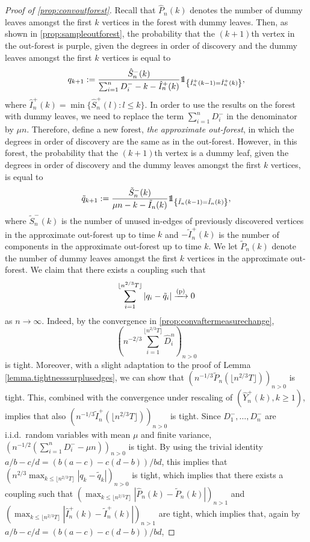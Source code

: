 \begin{proof}[Proof of \cref{prop:convoutforest}]
Recall that $\hat{P}_n(k)$ denotes the number of dummy leaves amongst the first $k$ vertices in the forest with dummy leaves. Then, as shown in \cref{prop:sampleoutforest}, the probability that the $(k+1)$th vertex in the out-forest is purple, given the degrees in order of discovery and the dummy leaves amongst the first $k$ vertices is equal to
$$q_{k+1}:=\frac{\hat{S}^-_n(k)}{\sum_{i=1}^n D^-_i-k-\hat{I}^+_n(k)}\one_{\left\{\hat{I}^+_n(k-1)= \hat{I}^+_n(k)\right\}},$$
where $\hat{I}^+_n(k)=\min\{\hat{S}^{+}_n(l):l\leq k\}$.
In order to use the results on the forest with dummy leaves, we need to replace the term $\sum_{i=1}^n D^-_i$ in the denominator by $\mu n$. Therefore, define a new forest, \emph{the approximate out-forest}, in which the degrees in order of discovery are the same as in the out-forest. However, in this forest, the probability that the $(k+1)$th vertex is a dummy leaf, given the degrees in order of discovery and the dummy leaves amongst the first $k$ vertices, is equal to
$$\tilde{q}_{k+1}:=\frac{\tilde{S}^-_n(k)}{\mu n-k-\tilde{I}_n(k)}\one_{\left\{\tilde{I}_n(k-1)=\tilde{I}_n(k)\right\}},$$
where $\tilde{S}^-_n(k)$ is the number of unused in-edges of previously discovered vertices in the approximate out-forest up to time $k$ and $-\tilde{I}^+_n(k)$ is the number of components in the approximate out-forest up to time $k$. We let $\tilde{P}_n(k)$ denote the number of dummy leaves amongst the first $k$ vertices in the approximate out-forest. 
We claim that there exists a coupling such that
$$\sum_{i=1}^{\lfloor n^{2/3}T\rfloor }|q_i-\tilde{q}_i|\xrightarrow[]{\mathrm{(p)}}0$$
as $n\to \infty$. 
Indeed, by the convergence in \cref{prop:convaftermeasurechange}, 
$$\left(n^{-2/3}\sum_{i=1}^{\lfloor n^{2/3}T\rfloor} \hat{D}^n_i\right)_{n>0}$$ is tight. Moreover, with a slight adaptation to the proof of Lemma \ref{lemma.tightnesssurplusedges}, we can show that $\left(n^{-1/3}\tilde{P}_n\left(\lfloor n^{2/3}T\rfloor \right)\right)_{n>0}$ is tight. This, combined with the convergence under rescaling of $(\hat{Y}^+_n(k),k\geq 1)$, implies that also $\left(n^{-1/3}\tilde{I}^+_n\left(\lfloor n^{2/3}T\rfloor \right)\right)_{n>0}$ is tight.  Since $D^-_1,\dots,D^-_n$ are i.i.d.\ random variables with mean $\mu$ and finite variance,
$\left(n^{-1/2}\left(\sum_{i=1}^{n}D^-_i-\mu n\right)\right)_{n>0}$ is tight. By using the trivial identity $a/b-c/d=(b(a-c)-c(d-b))/bd$, this implies that
$\left(n^{2/3}\max_{k\leq \lfloor n^{2/3}T\rfloor }|q_k-\tilde{q}_k|\right)_{n>0}$ is tight, which implies that there exists a coupling such that $\left(\max_{k\leq \lfloor n^{2/3}T\rfloor } |\hat{P}_n(k)-\tilde{P}_n(k)|\right)_{n>1}$ and $\left(\max_{k\leq \lfloor n^{2/3}T\rfloor } |\hat{I}^+_n(k)-\tilde{I}^+_n(k)|\right)_{n>1}$ are tight, which implies that, again by $a/b-c/d=(b(a-c)-c(d-b))/bd$, 

\end{proof}
